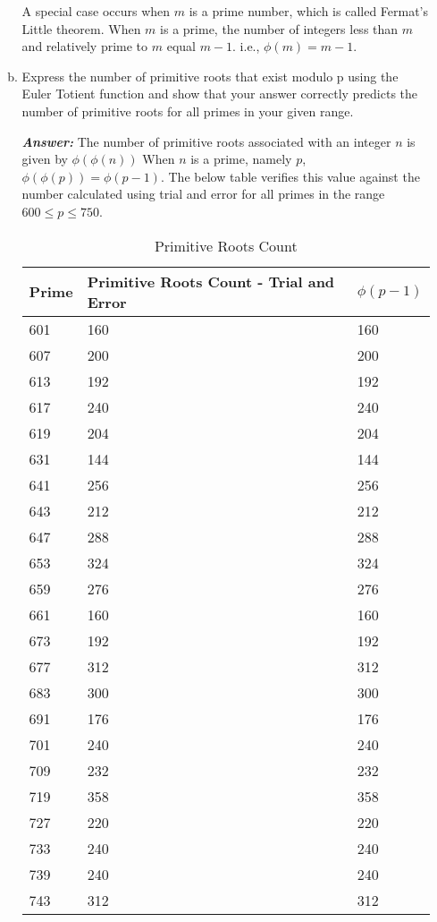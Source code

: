\documentclass[11pt,a4paper]{article}
\begin{document}
\begin{enumerate}[1.]
\begin{enumerate}[a.]
\begin{flushleft}
				A special case occurs when $m$ is a prime number, which is called Fermat's Little theorem. When $m$ is a prime, the number of integers less than $m$ and relatively prime to $m$ equal $m-1$. i.e., $\phi(m) = m - 1$.  
			\end{flushleft}
			\item Express the number of primitive roots that exist modulo p using the Euler Totient function and show that your answer correctly predicts the number of primitive roots for all primes in your given range.
			\begin{flushleft}
				\textbf{\textit{Answer:}} The number of primitive roots associated with an integer $n$ is given by $\phi(\phi(n))$
				When $n$ is a prime, namely $p$, $\phi(\phi(p)) = \phi(p-1)$. The below table verifies this value against the number calculated using trial and error for all primes in the range $600 \le p \le 750$.
				
				\begin{table}[!ht]
					\centering
					\begin{tabular}{|l|l|l|}
						\hline
						Prime & Primitive Roots Count - Trial and Error & $\phi(p-1)$ \\ \hline
						601 & 160 & 160 \\ \hline
						607 & 200 & 200 \\ \hline
						613 & 192 & 192 \\ \hline
						617 & 240 & 240 \\ \hline
						619 & 204 & 204 \\ \hline
						631 & 144 & 144 \\ \hline
						641 & 256 & 256 \\ \hline
						643 & 212 & 212 \\ \hline
						647 & 288 & 288 \\ \hline
						653 & 324 & 324 \\ \hline
						659 & 276 & 276 \\ \hline
						661 & 160 & 160 \\ \hline
						673 & 192 & 192 \\ \hline
						677 & 312 & 312 \\ \hline
						683 & 300 & 300 \\ \hline
						691 & 176 & 176 \\ \hline
						701 & 240 & 240 \\ \hline
						709 & 232 & 232 \\ \hline
						719 & 358 & 358 \\ \hline
						727 & 220 & 220 \\ \hline
						733 & 240 & 240 \\ \hline
						739 & 240 & 240 \\ \hline
						743 & 312 & 312 \\ \hline
					\end{tabular}
					\caption{Primitive Roots Count}
					\label{table:primitive_roots_count}
				\end{table}
				

\end{flushleft}
\end{enumerate}
\end{enumerate}
\end{document}
